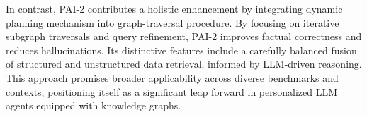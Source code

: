 In contrast, PAI-2 contributes a holistic enhancement by integrating dynamic planning mechanism into graph-traversal procedure. By focusing on iterative subgraph traversals and query refinement, PAI-2 improves factual correctness and reduces hallucinations. Its distinctive features include a carefully balanced fusion of structured and unstructured data retrieval, informed by LLM-driven reasoning. This approach promises broader applicability across diverse benchmarks and contexts, positioning itself as a significant leap forward in personalized LLM agents equipped with knowledge graphs.


